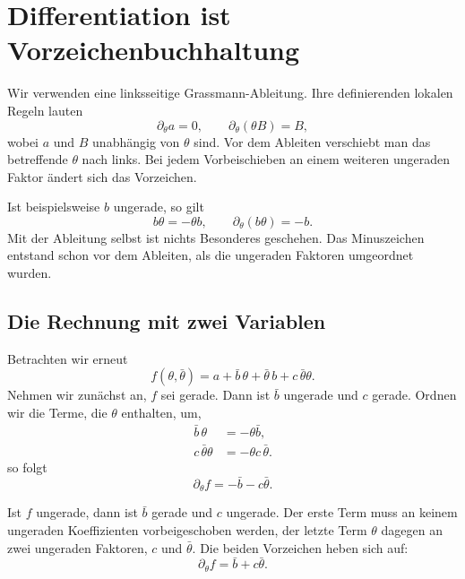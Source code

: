 \section{Differentiation ist Vorzeichenbuchhaltung}

Wir verwenden eine linksseitige Grassmann-Ableitung. Ihre definierenden lokalen Regeln lauten
\begin{equation}
\partial_\theta a=0,
\qquad
\partial_\theta(\theta B)=B,
\end{equation}
wobei \(a\) und \(B\) unabhängig von \(\theta\) sind. Vor dem Ableiten verschiebt man das betreffende \(\theta\) nach links. Bei jedem Vorbeischieben an einem weiteren ungeraden Faktor ändert sich das Vorzeichen.

Ist beispielsweise \(b\) ungerade, so gilt
\begin{equation}
b\theta=-\theta b,
\qquad
\partial_\theta(b\theta)=-b.
\end{equation}
Mit der Ableitung selbst ist nichts Besonderes geschehen. Das Minuszeichen entstand schon vor dem Ableiten, als die ungeraden Faktoren umgeordnet wurden.

\subsection{Die Rechnung mit zwei Variablen}

Betrachten wir erneut
\begin{equation}
f(\theta,\bar\theta)
=a+\bar b\,\theta+\bar\theta\,b+c\,\bar\theta\theta.
\end{equation}
Nehmen wir zunächst an, \(f\) sei gerade. Dann ist \(\bar b\) ungerade und \(c\) gerade. Ordnen wir die Terme, die \(\theta\) enthalten, um,
\begin{align}
\bar b\,\theta&=-\theta\bar b,\\
c\,\bar\theta\theta&=-\theta c\,\bar\theta.
\end{align}
so folgt
\begin{equation}
\partial_\theta f=-\bar b-c\bar\theta.
\end{equation}

Ist \(f\) ungerade, dann ist \(\bar b\) gerade und \(c\) ungerade. Der erste Term muss an keinem ungeraden Koeffizienten vorbeigeschoben werden, der letzte Term \(\theta\) dagegen an zwei ungeraden Faktoren, \(c\) und \(\bar\theta\). Die beiden Vorzeichen heben sich auf:
\begin{equation}
\partial_\theta f=\bar b+c\bar\theta.
\end{equation}

